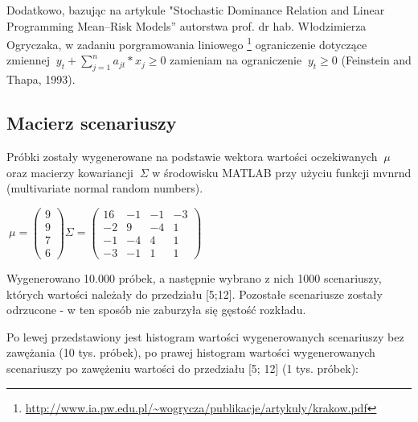 \documentclass[11pt]{article} %
\begin{document}
Dodatkowo, bazując na artykule "Stochastic Dominance Relation and Linear Programming Mean–Risk Models'' autorstwa prof. dr hab. Włodzimierza Ogryczaka, w zadaniu porgramowania liniowego \footnote{
	\url{http://www.ia.pw.edu.pl/~wogrycza/publikacje/artykuly/krakow.pdf}
} ograniczenie dotyczące zmiennej $\  y_t + \sum_{j=1}^{n} a_{jt} * x_j \geqslant 0 $ zamieniam na ograniczenie $\ y_t \geqslant 0 $ (Feinstein and Thapa, 1993).

\subsection{Macierz scenariuszy}

Próbki zostały wygenerowane na podstawie wektora wartości oczekiwanych $\ \mu $ oraz macierzy kowariancji $\ \Sigma $ w środowisku MATLAB przy użyciu funkcji mvnrnd (multivariate normal random numbers). 

\begin{center}
$\ \mu = \begin{pmatrix}
9\\ 
9\\ 
7\\ 
6
\end{pmatrix} 
\Sigma = \begin{pmatrix}
16 & -1 & -1 & -3 \\ 
-2 & 9 & -4 & 1 \\ 
-1 & -4 & 4 & 1\\ 
-3 & -1 & 1 & 1
\end{pmatrix}$

\end{center}
Wygenerowano 10.000 próbek, a następnie wybrano z nich 1000 scenariuszy, których wartości należały do przedziału [5;12]. Pozostałe scenariusze zostały odrzucone - w ten sposób nie zaburzyła się gęstość rozkładu.

Po lewej przedstawiony jest histogram wartości wygenerowanych scenariuszy bez zawężania (10 tys. próbek), po prawej histogram wartości wygenerowanych scenariuszy po zawężeniu wartości do przedziału [5; 12] (1 tys. próbek):
\end{document}
